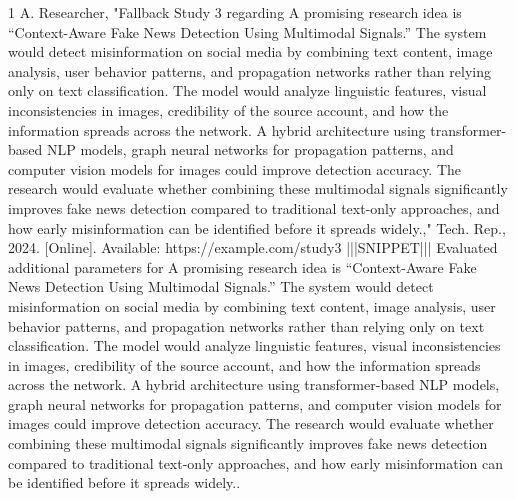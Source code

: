 \documentclass[conference]{IEEEtran}
\begin{document}
\begin{thebibliography}{1}
A. Researcher, "Fallback Study 3 regarding A promising research idea is “Context-Aware Fake News Detection Using Multimodal Signals.” The system would detect misinformation on social media by combining text content, image analysis, user behavior patterns, and propagation networks rather than relying only on text classification. The model would analyze linguistic features, visual inconsistencies in images, credibility of the source account, and how the information spreads across the network. A hybrid architecture using transformer-based NLP models, graph neural networks for propagation patterns, and computer vision models for images could improve detection accuracy. The research would evaluate whether combining these multimodal signals significantly improves fake news detection compared to traditional text-only approaches, and how early misinformation can be identified before it spreads widely.," Tech. Rep., 2024. [Online]. Available: https://example.com/study3 |||SNIPPET||| Evaluated additional parameters for A promising research idea is “Context-Aware Fake News Detection Using Multimodal Signals.” The system would detect misinformation on social media by combining text content, image analysis, user behavior patterns, and propagation networks rather than relying only on text classification. The model would analyze linguistic features, visual inconsistencies in images, credibility of the source account, and how the information spreads across the network. A hybrid architecture using transformer-based NLP models, graph neural networks for propagation patterns, and computer vision models for images could improve detection accuracy. The research would evaluate whether combining these multimodal signals significantly improves fake news detection compared to traditional text-only approaches, and how early misinformation can be identified before it spreads widely..

\end{thebibliography}
\end{document}
